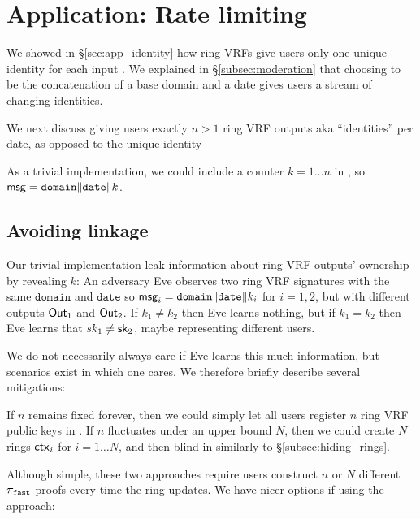 \section{Application: Rate limiting}
\label{sec:app_rate_limits}

We showed in \S\ref{sec:app_identity} how ring VRFs give users only
one unique identity for each input \msg.  
We explained in \S\ref{subsec:moderation} that choosing \msg to be
the concatenation of a base domain and a date gives users a stream of changing identities.

We next discuss giving users exactly $n > 1$ ring VRF outputs aka
``identities'' per date, as opposed to the unique identity 



As a trivial implementation, we could include a counter $k = 1 \ldots n$
in \msg, so $\mathsf{msg} = \mathtt{domain} \| \mathtt{date} \| k$.


\subsection{Avoiding linkage}

Our trivial implementation leak information about ring VRF outputs'
 ownership by revealing $k$:
%
An adversary Eve observes two ring VRF signatures with the same
$\mathtt{domain}$ and $\mathtt{date}$ so
$\mathsf{msg}_i = \mathtt{domain} \| \mathtt{date} \| k_i$
for $i=1,2$, but with different outputs ${\mathsf{Out}}_1$ and ${\mathsf{Out}}_2$.
If $k_1 \ne k_2$ then Eve learns nothing, but if $k_1 = k_2$ then
 Eve learns that $sk_1 \ne \mathsf{sk}_2$, maybe representing different users. 

We do not necessarily always care if Eve learns this much information,
but scenarios exist in which one cares.  We therefore briefly describe
several mitigations:

If $n$ remains fixed forever, then we could simply let all users
register $n$ ring VRF public keys in \ctx.
If $n$ fluctuates under an upper bound $N$, then we could create $N$
rings $\mathsf{ctx}_i$ for $i = 1 \ldots N$, and
 then blind \comring in \pifast similarly to \S\ref{subsec:hiding_rings}.

Although simple, these two approaches require users construct $n$ or $N$
different $\pi_{\mathtt{fast}}$ proofs every time the ring \ctx updates.
We have nicer options if using the \pisafe approach: 

